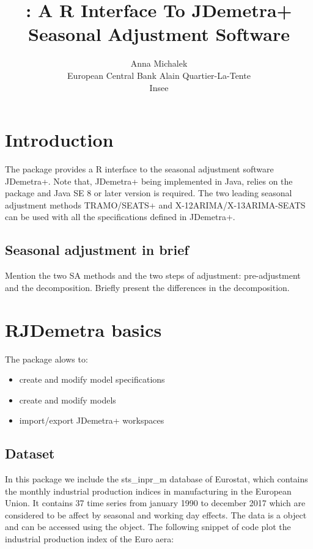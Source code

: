 \documentclass[article]{jss}
\author{
Anna Michalek\\European Central Bank \And Alain Quartier-La-Tente\\Insee
}
\title{\pkg{RJDemetra}: A R Interface To JDemetra+ Seasonal Adjustment Software}
\providecommand{\tightlist}{%
  \setlength{\itemsep}{0pt}\setlength{\parskip}{0pt}}
\begin{document}
\hypertarget{introduction}{%
\section{Introduction}\label{introduction}}

The package  provides a R interface to the seasonal
adjustment software JDemetra+. Note that, JDemetra+ being implemented in
Java,  relies on the  package and Java SE 8 or
later version is required. The two leading seasonal adjustment methods
TRAMO/SEATS+ and X-12ARIMA/X-13ARIMA-SEATS can be used with all the
specifications defined in JDemetra+.

\hypertarget{seasonal-adjustment-in-brief}{%
\subsection{Seasonal adjustment in
brief}\label{seasonal-adjustment-in-brief}}

Mention the two SA methods and the two steps of adjustment:
pre-adjustment and the decomposition. Briefly present the differences in
the decomposition.

\hypertarget{rjdemetra-basics}{%
\section{RJDemetra basics}\label{rjdemetra-basics}}

The  package alows to:

\begin{itemize}
\tightlist
\item
  create and modify model specifications
\item
  create and modify models
\item
  import/export JDemetra+ workspaces
\end{itemize}

\hypertarget{dataset}{%
\subsection{Dataset}\label{dataset}}

In this package we include the sts\_inpr\_m database of Eurostat, which
contains the monthly industrial production indices in manufacturing in
the European Union. It contains 37 time series from january 1990 to
december 2017 which are considered to be affect by seasonal and working
day effects. The data is a  object and can be accessed using
the  object. The following snippet of code plot the
industrial production index of the Euro aera:
\end{document}
